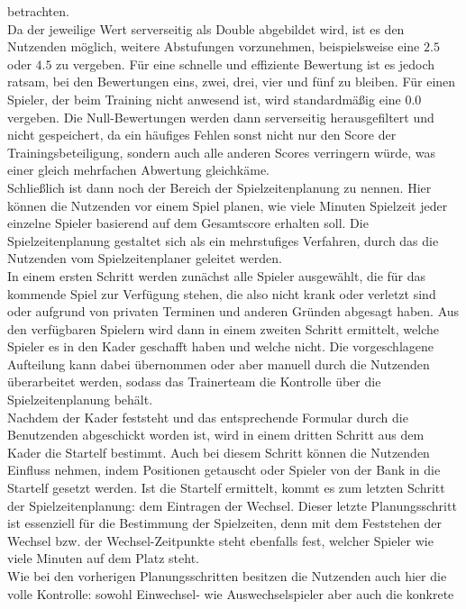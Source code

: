 betrachten. \\ 
Da der jeweilige Wert serverseitig als Double abgebildet wird, ist es den Nutzenden 
möglich, weitere Abstufungen vorzunehmen, beispielsweise eine $ 2.5 $ oder 
$ 4.5 $ zu vergeben. Für eine schnelle und effiziente Bewertung ist es jedoch 
ratsam, bei den Bewertungen eins, zwei, drei, vier und fünf zu bleiben. Für einen 
Spieler, der beim Training nicht anwesend ist, wird standardmäßig eine $ 0.0 $ 
vergeben. Die Null-Bewertungen werden dann serverseitig herausgefiltert und 
nicht gespeichert, da ein häufiges Fehlen sonst nicht nur den Score der 
Trainingsbeteiligung, sondern auch alle anderen Scores verringern würde, was einer 
gleich mehrfachen Abwertung gleichkäme. \\ 
Schließlich ist dann noch der Bereich der Spielzeitenplanung zu nennen. Hier können 
die Nutzenden vor einem Spiel planen, wie viele Minuten Spielzeit jeder einzelne 
Spieler basierend auf dem Gesamtscore erhalten soll. Die Spielzeitenplanung 
gestaltet sich als ein mehrstufiges Verfahren, durch das die Nutzenden vom 
Spielzeitenplaner geleitet werden. \\ 
In einem ersten Schritt werden zunächst alle Spieler ausgewählt, die für das 
kommende Spiel zur Verfügung stehen, die also nicht krank oder verletzt sind oder 
aufgrund von privaten Terminen und anderen Gründen abgesagt haben. Aus den 
verfügbaren Spielern wird dann in einem zweiten Schritt ermittelt, welche Spieler 
es in den Kader geschafft haben und welche nicht. Die vorgeschlagene Aufteilung 
kann dabei übernommen oder aber manuell durch die Nutzenden überarbeitet werden, 
sodass das Trainerteam die Kontrolle über die Spielzeitenplanung behält. \\ 
Nachdem der Kader feststeht und das entsprechende Formular durch die Benutzenden 
abgeschickt worden ist, wird in einem dritten Schritt aus dem Kader die Startelf 
bestimmt. Auch bei diesem Schritt können die Nutzenden Einfluss nehmen, indem 
Positionen getauscht oder Spieler von der Bank in die Startelf gesetzt werden. Ist 
die Startelf ermittelt, kommt es zum letzten Schritt der Spielzeitenplanung: 
dem Eintragen der Wechsel. Dieser letzte Planungsschritt ist essenziell für die 
Bestimmung der Spielzeiten, denn mit dem Feststehen der Wechsel bzw. der 
Wechsel-Zeitpunkte steht ebenfalls fest, welcher Spieler wie viele Minuten auf dem 
Platz steht. \\ 
Wie bei den vorherigen Planungsschritten besitzen die Nutzenden auch hier die volle 
Kontrolle: sowohl Einwechsel- wie Auswechselspieler aber auch die konkrete 
